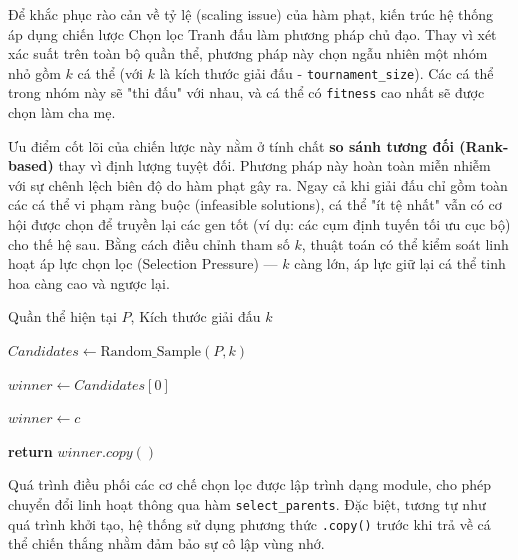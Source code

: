 \documentclass[12pt,a4paper]{article}
\numberwithin{figure}{subsection}
\newcounter{breakablealgocounter}
\newenvironment{breakablealgorithm}[1]
{
    \refstepcounter{breakablealgocounter}
    \begin{tcolorbox}[
        breakable,
        enhanced,
        colback=white,
        colframe=black!55,
        sharp corners,
        boxrule=0.5pt,
        left=2mm,
        right=2mm,
        top=1mm,
        bottom=1mm,
        title={Algorithm \thebreakablealgocounter. #1},
        fonttitle=\bfseries
    ]
}
{
    \end{tcolorbox}
}
\begin{document}
Để khắc phục rào cản về tỷ lệ (scaling issue) của hàm phạt, kiến trúc hệ thống áp dụng chiến lược Chọn lọc Tranh đấu làm phương pháp chủ đạo. Thay vì xét xác suất trên toàn bộ quần thể, phương pháp này chọn ngẫu nhiên một nhóm nhỏ gồm $k$ cá thể (với $k$ là kích thước giải đấu - \texttt{tournament\_size}). Các cá thể trong nhóm này sẽ "thi đấu" với nhau, và cá thể có \texttt{fitness} cao nhất sẽ được chọn làm cha mẹ.

Ưu điểm cốt lõi của chiến lược này nằm ở tính chất \textbf{so sánh tương đối (Rank-based)} thay vì định lượng tuyệt đối. Phương pháp này hoàn toàn miễn nhiễm với sự chênh lệch biên độ do hàm phạt gây ra. Ngay cả khi giải đấu chỉ gồm toàn các cá thể vi phạm ràng buộc (infeasible solutions), cá thể "ít tệ nhất" vẫn có cơ hội được chọn để truyền lại các gen tốt (ví dụ: các cụm định tuyến tối ưu cục bộ) cho thế hệ sau. Bằng cách điều chỉnh tham số $k$, thuật toán có thể kiểm soát linh hoạt áp lực chọn lọc (Selection Pressure) — $k$ càng lớn, áp lực giữ lại cá thể tinh hoa càng cao và ngược lại.

\begin{breakablealgorithm}{Toán tử Chọn lọc Tranh đấu (Tournament Selection)}
\label{alg:tournament_selection}
\begin{algorithmic}[1]
\Require Quần thể hiện tại $P$, Kích thước giải đấu $k$

\State $Candidates \gets \text{Random\_Sample}(P, k)$ 

\State $winner \gets Candidates[0]$

        \State $winner \gets c$ 
    \EndIf
\EndFor

\State \textbf{return} $winner.copy()$ 
\end{algorithmic}
\end{breakablealgorithm}

Quá trình điều phối các cơ chế chọn lọc được lập trình dạng module, cho phép chuyển đổi linh hoạt thông qua hàm \texttt{select\_parents}. Đặc biệt, tương tự như quá trình khởi tạo, hệ thống sử dụng phương thức \texttt{.copy()} trước khi trả về cá thể chiến thắng nhằm đảm bảo sự cô lập vùng nhớ.
\end{document}
